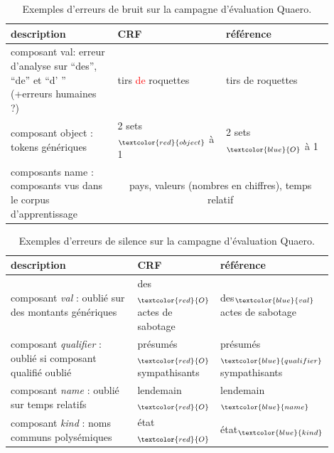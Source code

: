 \documentclass[12pt,a4paper,times,twoside,openright]{report}
\begin{document}
\begin{table}[ht!]
\centering
\begin{tabular}{|p{0.3\linewidth}|p{0.3\linewidth}|p{0.3\linewidth}|}
\hline
description                                                 & CRF & référence \\
\hline
composant val: erreur d'analyse sur ``des'', ``de'' et ``d' '' (+erreurs humaines ?) & tirs \textcolor{red}{de} roquettes & tirs de roquettes \\
\hline
composant object : tokens génériques & 2 sets$_{\textcolor{red}{object}}$ à 1 & 2 sets$_{\textcolor{blue}{O}}$ à 1 \\
\hline
composants name : composants vus dans le corpus d'apprentissage & \multicolumn{2}{c|}{pays, valeurs (nombres en chiffres), temps relatif}\\
\hline
\end{tabular}
\caption{Exemples d'erreurs de bruit sur la campagne d'évaluation Quaero.}
\label{tab:component-noise-examples}
\end{table}

\begin{table}[ht!]
\centering
\begin{tabular}{|p{0.4\linewidth}|p{0.25\linewidth}|p{0.25\linewidth}|}
\hline
description                                                        & CRF & référence \\
\hline
composant \textit{val} : oublié sur des montants génériques        & des$_{\textcolor{red}{O}}$ actes de sabotage & des$_{\textcolor{blue}{val}}$ actes de sabotage\\
\hline
composant \textit{qualifier} : oublié si composant qualifié oublié & présumés$_{\textcolor{red}{O}}$ sympathisants & présumés$_{\textcolor{blue}{qualifier}}$ sympathisants \\
\hline
composant \textit{name} : oublié sur temps relatifs                & lendemain$_{\textcolor{red}{O}}$ & lendemain$_{\textcolor{blue}{name}}$ \\
\hline
composant \textit{kind} : noms communs polysémiques                & état$_{\textcolor{red}{O}}$ & état$_{\textcolor{blue}{kind}}$ \\
\hline
\end{tabular}
\caption{Exemples d'erreurs de silence sur la campagne d'évaluation Quaero.}
\label{tab:component-silence-examples}
\end{table}
\end{document}
